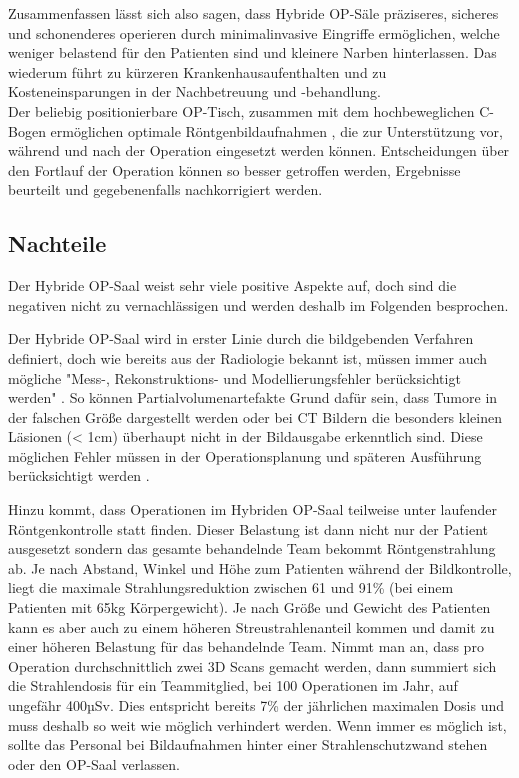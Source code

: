 

Zusammenfassen lässt sich also sagen, dass Hybride OP-Säle präziseres, sicheres und schonenderes operieren \cite{DresdnerUniklinikum} durch minimalinvasive Eingriffe ermöglichen, welche weniger belastend für den Patienten sind und kleinere Narben hinterlassen. Das wiederum  führt zu kürzeren Krankenhausaufenthalten und zu Kosteneinsparungen in der Nachbetreuung und -behandlung. \\
Der beliebig positionierbare OP-Tisch, zusammen mit dem hochbeweglichen C-Bogen  ermöglichen optimale Röntgenbildaufnahmen \cite{DresdnerUniklinikum}, die zur Unterstützung vor, während und nach der Operation eingesetzt werden können. Entscheidungen über den Fortlauf der Operation können so besser getroffen werden, Ergebnisse beurteilt und gegebenenfalls nachkorrigiert werden.

\subsection{Nachteile}

Der Hybride OP-Saal weist sehr viele positive Aspekte auf, doch sind die negativen nicht zu vernachlässigen und werden deshalb im Folgenden besprochen.

Der Hybride OP-Saal wird in erster Linie durch die bildgebenden Verfahren definiert, doch wie bereits aus der Radiologie bekannt ist, müssen immer auch mögliche "Mess-, Rekonstruktions- und Modellierungsfehler berücksichtigt werden" \cite{DerDigitaleOperationssaal}. 
So können Partialvolumenartefakte Grund dafür sein, dass Tumore in der falschen Größe dargestellt werden oder bei CT Bildern die besonders kleinen Läsionen (< 1cm) überhaupt nicht in der Bildausgabe erkenntlich sind. Diese möglichen Fehler müssen in der Operationsplanung und späteren Ausführung berücksichtigt werden \cite{DerDigitaleOperationssaal}.

Hinzu kommt, dass Operationen im Hybriden OP-Saal teilweise unter laufender Röntgenkontrolle statt finden. Dieser Belastung ist dann nicht nur der Patient ausgesetzt sondern das gesamte behandelnde Team bekommt Röntgenstrahlung ab. Je nach Abstand, Winkel und Höhe zum Patienten während der Bildkontrolle, liegt die maximale Strahlungsreduktion zwischen 61 und 91\% (bei einem Patienten mit 65kg Körpergewicht). Je nach Größe und Gewicht des Patienten kann es aber auch zu einem höheren Streustrahlenanteil kommen und damit zu einer höheren Belastung für das behandelnde Team.
Nimmt man an, dass pro Operation durchschnittlich zwei 3D Scans gemacht werden, dann summiert sich die Strahlendosis für ein Teammitglied, bei 100 Operationen im Jahr, auf ungefähr 400µSv. Dies entspricht bereits 7\% der jährlichen maximalen Dosis und muss deshalb so weit wie möglich verhindert werden. Wenn immer es möglich ist, sollte das Personal bei Bildaufnahmen hinter einer Strahlenschutzwand stehen oder den OP-Saal verlassen\cite{RadiationExposure}.


